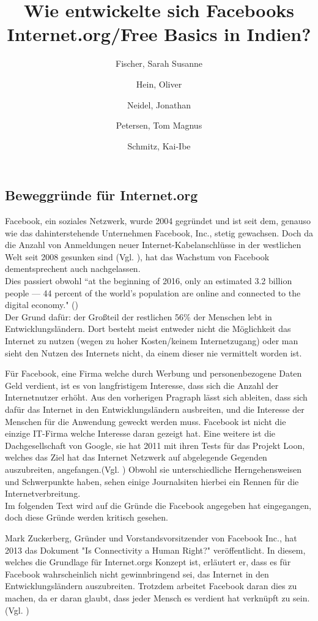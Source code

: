 \documentclass{article}
\title{Wie entwickelte sich Facebooks Internet.org/Free Basics in Indien?}
\author{
  Fischer, Sarah Susanne\\
  \and
  Hein, Oliver\\
  \and
  Neidel, Jonathan\\
  \and
  Petersen, Tom Magnus\\
  \and
  Schmitz, Kai-Ibe\\
}
\begin{document}
\subsection{Beweggründe für Internet.org}
Facebook, ein soziales Netzwerk, wurde 2004 gegründet und ist seit dem, genauso wie das dahinterstehende Unternehmen Facebook, Inc., stetig gewachsen. 
Doch da die Anzahl von Anmeldungen neuer Internet-Kabelanschlüsse in der westlichen Welt seit 2008 gesunken sind
(Vgl. \cite{ICTslowingDown}), hat das Wachstum von Facebook dementsprechent auch nachgelassen.\\
Dies passiert obwohl ``at the beginning of 2016, only an estimated 3.2 billion people — 44 percent of the world’s population are online and connected to the digital economy." (\cite{connectWorld})\\
Der Grund dafür: der Großteil der restlichen 56\% der Menschen lebt in Entwicklungsländern. Dort besteht meist entweder nicht die Möglichkeit das Internet zu nutzen (wegen zu hoher Kosten/keinem Internetzugang) oder man sieht den Nutzen des Internets nicht, da einem dieser nie vermittelt worden ist.

\medskip

Für Facebook, eine Firma welche durch Werbung und personenbezogene Daten Geld verdient, ist es von langfristigem Interesse, dass sich die Anzahl der Internetnutzer erhöht.
Aus den vorherigen Pragraph lässt sich ableiten, dass sich dafür das Internet in den Entwicklungsländern ausbreiten, und die Interesse der Menschen für die Anwendung geweckt werden muss.
Facebook ist nicht die einzige IT-Firma welche Interesse daran gezeigt hat.
Eine weitere ist die Dachgesellschaft von Google, sie hat 2011 mit ihren Tests für das Projekt Loon, welches das Ziel hat das Internet Netzwerk auf abgelegende Gegenden auszubreiten, angefangen.(Vgl. \cite{projectLoon})
Obwohl sie unterschiedliche Herngehensweisen und Schwerpunkte haben, sehen einige Journalsiten hierbei ein Rennen für die Internetverbreitung. \\
    
Im folgenden Text wird auf die Gründe die Facebook angegeben hat eingegangen, doch diese Gründe werden kritisch gesehen.   

\medskip
Mark Zuckerberg, Gründer und Vorstandsvorsitzender von Facebook Inc., hat 2013 das Dokument "Is Connectivity a Human Right?" veröffentlicht.
In diesem, welches die Grundlage für Internet.orgs Konzept ist, erläutert er, dass es für Facebook wahrscheinlich nicht gewinnbringend sei, das Internet in den Entwicklungsländern auszubreiten. Trotzdem arbeitet Facebook daran dies zu machen, da er daran glaubt, dass jeder Mensch es verdient hat verknüpft zu sein.(Vgl. \cite{HumanRight})
\end{document}
